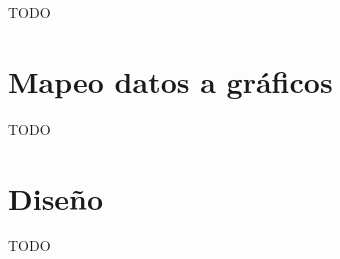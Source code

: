 \documentclass[letterpaper,10pt]{article}
\begin{document}
	TODO

	\newpage

	\section{Mapeo datos a gráficos}

	TODO

	\newpage

	\section{Diseño}

	TODO
\end{document}
